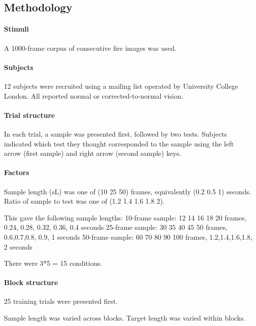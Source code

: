 \subsection{Methodology}

\paragraph{Stimuli}

A 1000-frame corpus of consecutive fire images was used.

\paragraph{Subjects}

12 subjects were recruited using a mailing list operated by University College London. All reported normal or corrected-to-normal vision.

\paragraph{Trial structure}

In each trial, a sample was presented first, followed by two tests. Subjects indicated which test they thought corresponded to the sample using the left arrow (first sample) and right arrow (second sample) keys. 

\paragraph{Factors}

Sample length (sL) was one of (10 25 50) frames, equivalently (0.2 0.5 1) seconds.
Ratio of sample to test was one of (1.2 1.4 1.6 1.8 2).

This gave the following sample lengths:
10-frame sample: 12 14  16 18 20 frames, 0.24, 0.28, 0.32, 0.36, 0.4 seconds
25-frame sample: 30 35 40 45 50 frames, 0.6,0.7,0.8, 0.9, 1 seconds
50-frame sample: 60    70    80    90   100 frames, 1.2,1.4,1.6,1.8,  2 seconds

There were 3*5 = 15 conditions.

\paragraph{Block structure}

25 training trials were presented first.

Sample length was varied across blocks. Target length was varied within blocks.

